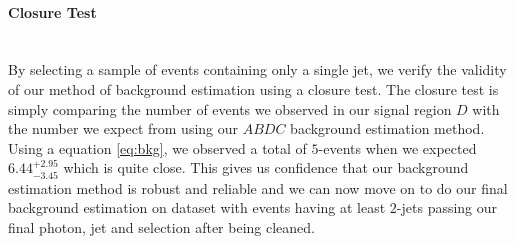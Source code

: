 \paragraph*{Closure Test}\mbox{}\\
By selecting a sample of events containing only a single jet, we verify the validity of our method of background estimation using a closure test. The closure test is simply comparing the number of events we observed in our signal region $D$ with the number we expect from using our $ABDC$ background estimation method.
Using a equation \ref{eq:bkg}, we observed a total of $5$-events when we expected $6.44^{+2.95}_{-3.45}$ which is quite close. This gives us confidence that our  background estimation method is robust and reliable and we can now move on to do our final background estimation on dataset with events having at least $2$-jets passing our final photon, jet and \MET selection after being cleaned.
